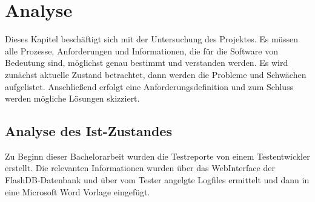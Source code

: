 \chapter{Analyse}
Dieses Kapitel beschäftigt sich mit der Untersuchung des Projektes. Es müssen alle Prozesse, Anforderungen und Informationen, die für die Software von Bedeutung sind, möglichst genau bestimmt und verstanden werden. Es wird zunächst aktuelle Zustand betrachtet, dann werden die Probleme und Schwächen aufgelistet. Anschließend erfolgt eine Anforderungsdefinition und zum Schluss werden mögliche Lösungen skizziert.
	
	\vspace{5mm}
	
\section{Analyse des Ist-Zustandes}
Zu Beginn dieser Bachelorarbeit wurden die Testreporte von einem Testentwickler erstellt. Die relevanten Informationen wurden über das WebInterface der FlashDB-Datenbank und über vom Tester angelgte Logfiles ermittelt und dann in eine Microsoft Word Vorlage eingefügt. 

	\vspace{5mm}
	
